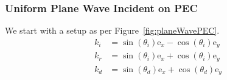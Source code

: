 \documentclass[lettersize,journal]{IEEEtran}
\begin{document}
\subsubsection{Uniform Plane Wave Incident on PEC}    
We start with a setup as per Figure~\ref{fig:planeWavePEC}. 
\begin{subequations}
   \begin{align}
      k_i &= \sin (\theta_i) \text{e}_x - \cos (\theta_i) \text{e}_y \\
      k_r &= \sin (\theta_i) \text{e}_x + \cos (\theta_i) \text{e}_y \\
      k_d &= \sin (\theta_d) \text{e}_x + \cos (\theta_d) \text{e}_y
   \end{align}
\end{subequations}
            \begin{figure}[H]
            \begin{center}
\end{center}
\end{figure}
\end{document}
